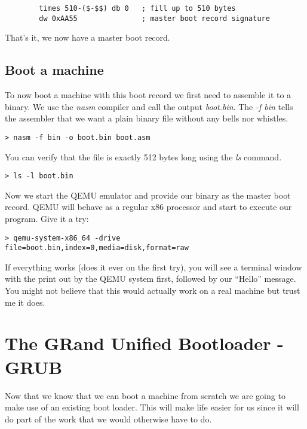 \documentclass[a4paper,11pt]{article}
\begin{document}
\begin{verbatim}
        times 510-($-$$) db 0   ; fill up to 510 bytes
        dw 0xAA55               ; master boot record signature 
\end{verbatim}

That's it, we now have a master boot record. 

\subsection{Boot a machine}

To now boot a machine with this boot record we first need to assemble
it to a binary. We use the {\em nasm} compiler and call the output
{\em boot.bin}. The {\em -f bin} tells the assembler that we want a
plain binary file without any bells nor whistles. 

\begin{verbatim}
> nasm -f bin -o boot.bin boot.asm
\end{verbatim}

You can verify that the file is exactly 512 bytes long using the {\em
  ls} command.

\begin{verbatim}
> ls -l boot.bin
\end{verbatim}

Now we start the QEMU emulator and provide our binary as the master
boot record. QEMU will behave as a regular x86 processor and start to
execute our program. Give it a try:

\begin{verbatim}
> qemu-system-x86_64 -drive file=boot.bin,index=0,media=disk,format=raw
\end{verbatim}

If everything works (does it ever on the first try), you will see a
terminal window with the print out by the QEMU system first, followed
by our ``Hello'' message. You might not believe that this would
actually work on a real machine but trust me it does. 

\section{The GRand Unified Bootloader - GRUB}

Now that we know that we can boot a machine from scratch we are going
to make use of an existing boot loader. This will make life easier for
us since it will do part of the work that we would otherwise have to do.
\end{document}
